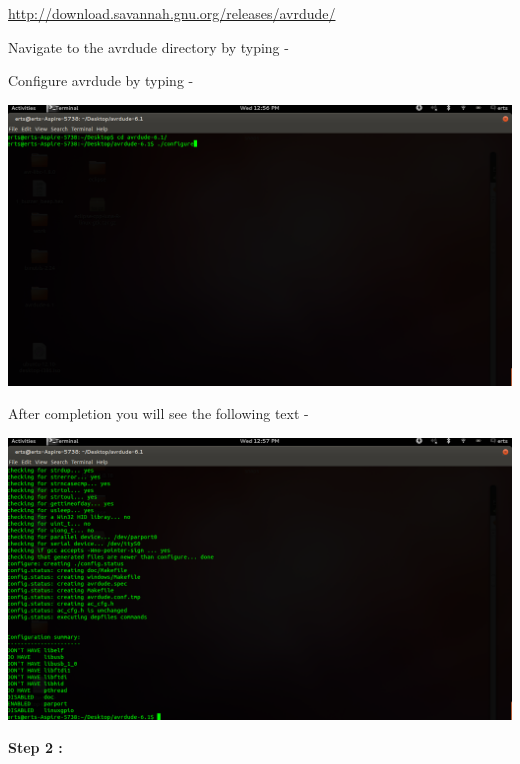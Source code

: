 \begin{flushleft}
\url{http://download.savannah.gnu.org/releases/avrdude/}

\medskip

Navigate to the avrdude directory by typing - 

\medskip


\medskip

Configure avrdude by typing - 
\medskip


\medskip

\includegraphics[scale=0.3]{f18}

\medskip

After completion you will see the following text - 

\medskip

\includegraphics[scale=0.3]{f19}

\medskip

\textbf{Step 2 :}

\medskip


\end{flushleft}

